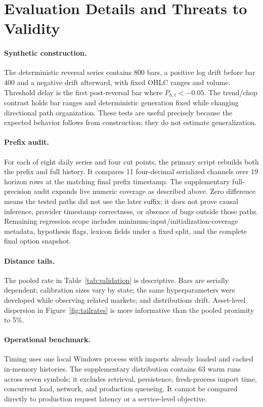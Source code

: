 \documentclass{article}
\newcommand{\pressure}{P}
\begin{document}
\section{Evaluation Details and Threats to Validity}

\paragraph{Synthetic construction.}
The deterministic reversal series contains 800 bars, a positive log drift before bar 400 and a negative drift afterward, with fixed OHLC ranges and volume. Threshold delay is the first post-reversal bar where $\pressure_{h,t}<-0.05$. The trend/chop contrast holds bar ranges and deterministic generation fixed while changing directional path organization. These tests are useful precisely because the expected behavior follows from construction; they do not estimate generalization.

\paragraph{Prefix audit.}
For each of eight daily series and four cut points, the primary script rebuilds both the prefix and full history. It compares 11 four-decimal serialized channels over 19 horizon rows at the matching final prefix timestamp. The supplementary full-precision audit expands live numeric coverage as described above. Zero difference means the tested paths did not use the later suffix; it does not prove causal inference, provider timestamp correctness, or absence of bugs outside those paths. Remaining regression scope includes minimum-input/initialization-coverage metadata, hypothesis flags, lexicon fields under a fixed split, and the complete final option snapshot.

\paragraph{Distance tails.}
The pooled rate in Table~\ref{tab:validation} is descriptive. Bars are serially dependent; calibration sizes vary by state; the same hyperparameters were developed while observing related markets; and distributions drift. Asset-level dispersion in Figure~\ref{fig:tailrates} is more informative than the pooled proximity to 5\%.

\paragraph{Operational benchmark.}
Timing uses one local Windows process with imports already loaded and cached in-memory histories. The supplementary distribution contains 63 warm runs across seven symbols; it excludes retrieval, persistence, fresh-process import time, concurrent load, network, and production queueing. It cannot be compared directly to production request latency or a service-level objective.
\end{document}
